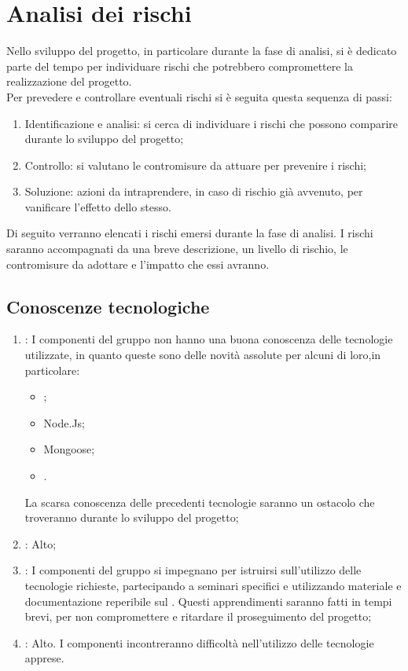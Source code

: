 \section{Analisi dei rischi}
Nello sviluppo del progetto, in particolare durante la fase di analisi, si è dedicato parte del tempo per individuare rischi che potrebbero compromettere la realizzazione del progetto.\\
Per prevedere e controllare eventuali rischi si è seguita questa sequenza di passi:
\begin{enumerate}
\item Identificazione e analisi: si cerca di individuare i rischi che possono comparire durante lo sviluppo del progetto;
\item Controllo: si valutano le contromisure da attuare  per prevenire i rischi;
\item Soluzione: azioni da intraprendere, in caso di rischio già avvenuto, per vanificare l'effetto dello stesso.
\end{enumerate}
Di seguito verranno elencati i rischi emersi durante la fase di analisi. I rischi saranno accompagnati da una breve descrizione, un livello di rischio, le contromisure da adottare e l'impatto che essi avranno.

\subsection{Conoscenze tecnologiche}
\begin{enumerate}
\item {}: I componenti del gruppo non hanno una buona conoscenza delle tecnologie utilizzate, in quanto queste sono delle novità assolute per alcuni di loro,in particolare:
\begin{itemize}
\item {};
\item Node.Js;
\item Mongoose;
\item {}.
\end{itemize}
La scarsa conoscenza delle precedenti tecnologie  saranno un ostacolo che troveranno durante lo sviluppo del progetto;
\item {}: Alto;
\item {}: I componenti del gruppo si impegnano per istruirsi sull'utilizzo delle tecnologie richieste, partecipando a seminari specifici e utilizzando materiale e documentazione reperibile sul . Questi apprendimenti saranno fatti in tempi brevi, per non compromettere  e ritardare il proseguimento del progetto;
\item {}: Alto. I componenti incontreranno difficoltà nell'utilizzo delle tecnologie apprese.
\end{enumerate}

